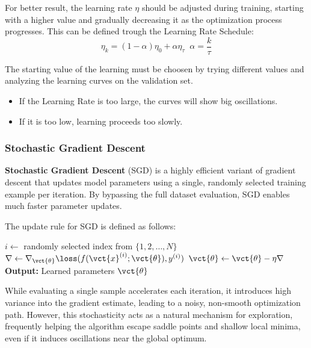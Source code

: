 {
    For better result, the learning rate $\eta$ should be adjusted during training, starting with a higher 
    value and gradually decreasing it as the optimization process progresses.
    This can be defined trough the Learning Rate Schedule:
    \begin{equation*}
        \eta_k = (1 - \alpha)\eta_0 + \alpha \eta_{\tau}\;\;\alpha = \frac{k}{\tau}
    \end{equation*}
    
    The starting value of the learning must be choosen by trying different values and analyzing the 
    learning curves on the validation set.
    \begin{itemize}
        \item If the Learning Rate is too large, the curves will show big oscillations.
        \item If it is too low, learning proceeds too slowly.
    \end{itemize}
}


\subsubsection*{Stochastic Gradient Descent}
\textbf{Stochastic Gradient Descent} (SGD) is a highly efficient variant of gradient descent that updates model parameters using a single, randomly selected training example per iteration. By bypassing the full dataset evaluation, SGD enables much faster parameter updates.

The update rule for SGD is defined as follows:
\begin{algorithm}[H]
    \caption{Stochastic Gradient Descent}
    \begin{algorithmic}[1]
            \State $i \leftarrow$ randomly selected index from $\{1, 2, \ldots, N\}$
            \State $\nabla \leftarrow \nabla_{\vct{\theta}} \loss(f(\vct{x}^{(i)}; \vct{\theta}), y^{(i)})$
            \State $\vct{\theta} \leftarrow \vct{\theta} - \eta \nabla$
        \EndWhile
        \State \textbf{Output:} Learned parameters $\vct{\theta}$
    \end{algorithmic}
\end{algorithm}
While evaluating a single sample accelerates each iteration, it introduces high variance into the gradient estimate, leading to a noisy, non-smooth optimization path. However, this stochasticity acts as a natural mechanism for exploration, frequently helping the algorithm escape saddle points and shallow local minima, even if it induces oscillations near the global optimum.

